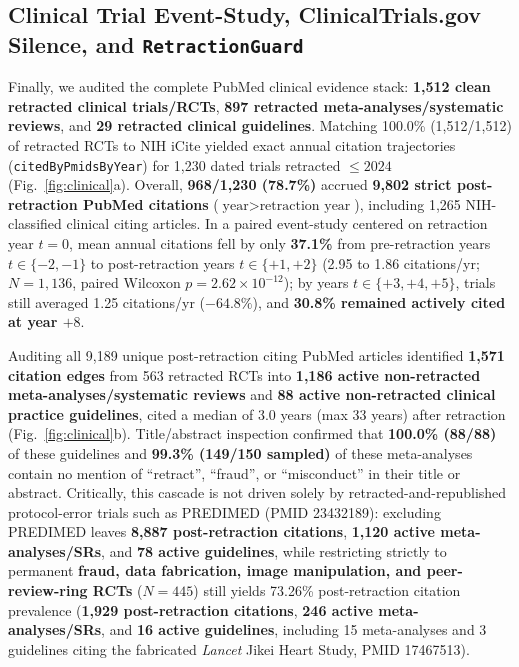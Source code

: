 \documentclass[11pt,letterpaper]{article}
\begin{document}
\subsection{Clinical Trial Event-Study, ClinicalTrials.gov Silence, and \texttt{RetractionGuard}}
Finally, we audited the complete PubMed clinical evidence stack: \textbf{1,512 clean retracted clinical trials/RCTs}, \textbf{897 retracted meta-analyses/systematic reviews}, and \textbf{29 retracted clinical guidelines}. Matching 100.0\% (1,512/1,512) of retracted RCTs to NIH iCite yielded exact annual citation trajectories (\texttt{citedByPmidsByYear}) for 1,230 dated trials retracted $\le 2024$ (Fig.~\ref{fig:clinical}a). Overall, \textbf{968/1,230 (78.7\%)} accrued \textbf{9,802 strict post-retraction PubMed citations} ($\text{year} > \text{retraction year}$), including 1,265 NIH-classified clinical citing articles. In a paired event-study centered on retraction year $t=0$, mean annual citations fell by only \textbf{37.1\%} from pre-retraction years $t\in\{-2,-1\}$ to post-retraction years $t\in\{+1,+2\}$ (2.95 to 1.86 citations/yr; $N=1{,}136$, paired Wilcoxon $p=2.62\times 10^{-12}$); by years $t\in\{+3,+4,+5\}$, trials still averaged 1.25 citations/yr ($-64.8\%$), and \textbf{30.8\% remained actively cited at year $+8$}.

Auditing all 9,189 unique post-retraction citing PubMed articles identified \textbf{1,571 citation edges} from 563 retracted RCTs into \textbf{1,186 active non-retracted meta-analyses/systematic reviews} and \textbf{88 active non-retracted clinical practice guidelines}, cited a median of 3.0 years (max 33 years) after retraction (Fig.~\ref{fig:clinical}b). Title/abstract inspection confirmed that \textbf{100.0\% (88/88)} of these guidelines and \textbf{99.3\% (149/150 sampled)} of these meta-analyses contain no mention of ``retract'', ``fraud'', or ``misconduct'' in their title or abstract. Critically, this cascade is not driven solely by retracted-and-republished protocol-error trials such as PREDIMED (PMID 23432189): excluding PREDIMED leaves \textbf{8,887 post-retraction citations}, \textbf{1,120 active meta-analyses/SRs}, and \textbf{78 active guidelines}, while restricting strictly to permanent \textbf{fraud, data fabrication, image manipulation, and peer-review-ring RCTs} ($N=445$) still yields 73.26\% post-retraction citation prevalence (\textbf{1,929 post-retraction citations}, \textbf{246 active meta-analyses/SRs}, and \textbf{16 active guidelines}, including 15 meta-analyses and 3 guidelines citing the fabricated \emph{Lancet} Jikei Heart Study, PMID 17467513).
\end{document}
